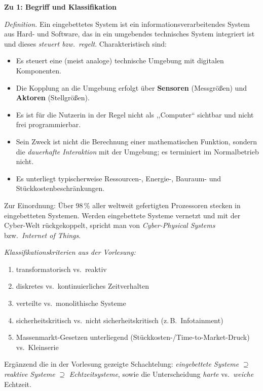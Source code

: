 \begin{loesung}
\textbf{Zu 1: Begriff und Klassifikation}

\emph{Definition.} Ein eingebettetes System ist ein informationsverarbeitendes System aus Hard- und
Software, das in ein umgebendes technisches System integriert ist und dieses \emph{steuert bzw.\ regelt}.
Charakteristisch sind:
\begin{itemize}
    \item Es steuert eine (meist analoge) technische Umgebung mit digitalen Komponenten.
    \item Die Kopplung an die Umgebung erfolgt über \textbf{Sensoren} (Messgrößen) und \textbf{Aktoren} (Stellgrößen).
    \item Es ist für die Nutzerin in der Regel nicht als ,,Computer`` sichtbar und nicht frei programmierbar.
    \item Sein Zweck ist nicht die Berechnung einer mathematischen Funktion, sondern die \emph{dauerhafte
          Interaktion} mit der Umgebung; es terminiert im Normalbetrieb nicht.
    \item Es unterliegt typischerweise Ressourcen-, Energie-, Bauraum- und Stückkostenbeschränkungen.
\end{itemize}
Zur Einordnung: Über 98\,\% aller weltweit gefertigten Prozessoren stecken in eingebetteten Systemen.
Werden eingebettete Systeme vernetzt und mit der Cyber-Welt rückgekoppelt, spricht man von
\emph{Cyber-Physical Systems} bzw.\ \emph{Internet of Things}.

\emph{Klassifikationskriterien aus der Vorlesung:}
\begin{enumerate}[label=(\alph*)]
    \item transformatorisch vs.\ reaktiv
    \item diskretes vs.\ kontinuierliches Zeitverhalten
    \item verteilte vs.\ monolithische Systeme
    \item sicherheitskritisch vs.\ nicht sicherheitskritisch (z.\,B.\ Infotainment)
    \item Massenmarkt-Gesetzen unterliegend (Stückkosten-/Time-to-Market-Druck) vs.\ Kleinserie
\end{enumerate}
Ergänzend die in der Vorlesung gezeigte Schachtelung: \emph{eingebettete Systeme} $\supseteq$
\emph{reaktive Systeme} $\supseteq$ \emph{Echtzeitsysteme}, sowie die Unterscheidung \emph{harte} vs.\
\emph{weiche} Echtzeit.

\begin{table}[h]
\centering
\footnotesize
\renewcommand{\arraystretch}{1.25}
\end{table}
\end{loesung}
